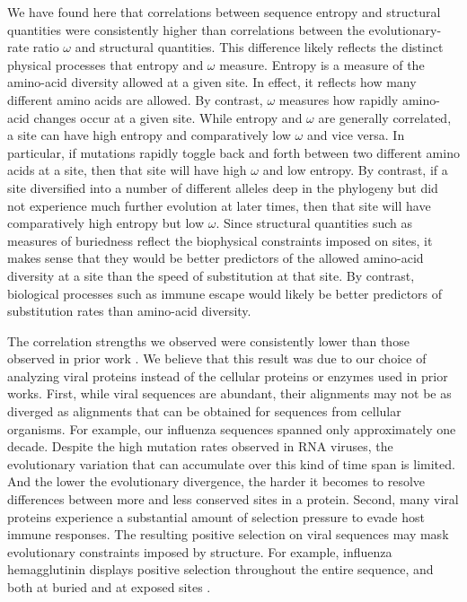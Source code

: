 \documentclass[12pt]{article}
\begin{document}
We have found here that correlations between sequence entropy and structural quantities were consistently higher than correlations between the evolutionary-rate ratio $\omega$ and structural quantities. This difference likely reflects the distinct physical processes that entropy and $\omega$ measure. Entropy is a measure of the amino-acid diversity allowed at a given site. In effect, it reflects how many different amino acids are allowed. By contrast, $\omega$ measures how rapidly amino-acid changes occur at a given site. While entropy and $\omega$ are generally correlated, a site can have high entropy and comparatively low $\omega$ and vice versa. In particular, if mutations rapidly toggle back and forth between two different amino acids at a site, then that site will have high $\omega$ and low entropy. By contrast, if a site diversified into a number of different alleles deep in the phylogeny but did not experience much further evolution at later times, then that site will have comparatively high entropy but low $\omega$. Since structural quantities such as measures of buriedness reflect the biophysical constraints imposed on sites, it makes sense that they would be better predictors of the allowed amino-acid diversity at a site than the speed of substitution at that site. By contrast, biological processes such as immune escape would likely be better predictors of substitution rates than amino-acid diversity.

The correlation strengths we observed were consistently lower than those observed in prior work \citep{Jacksonetal2013,Yehetal2014}. We believe that this result was due to our choice of analyzing viral proteins instead of the cellular proteins or enzymes used in prior works. First, while viral sequences are abundant, their alignments may not be as diverged as alignments that can be obtained for sequences from cellular organisms. For example, our influenza sequences spanned only approximately one decade. Despite the high mutation rates observed in RNA viruses, the evolutionary variation that can accumulate over this kind of time span is limited. And the lower the evolutionary divergence, the harder it becomes to resolve differences between more and less conserved sites in a protein. Second, many viral proteins experience a substantial amount of selection pressure to evade host immune responses. The resulting positive selection on viral sequences may mask evolutionary constraints imposed by structure. For example, influenza hemagglutinin displays positive selection throughout the entire sequence, and both at buried and at exposed sites \citep{MeyerWilke2013,Meyeretal2013,Suzuki2006,Bushetal1999}.
\end{document}
